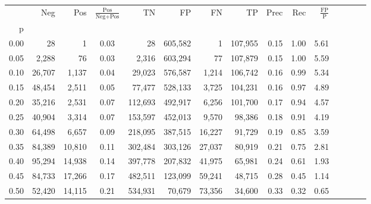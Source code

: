 \begin{tabular}{rrrcrrrrrrrrrrr}
\toprule
{} &     Neg &     Pos & $\frac{\text{Pos}}{\text{Neg}+\text{Pos}}$ &       TN &       FP &       FN &       TP &  Prec &   Rec & $\frac{\text{FP}}{\text{P}}$ \\
p    &         &         &                                            &          &          &          &          &       &       &                              \\
\midrule
0.00 &      28 &       1 &                                       0.03 &       28 &  605,582 &        1 &  107,955 &  0.15 &  1.00 &                         5.61 \\
0.05 &   2,288 &      76 &                                       0.03 &    2,316 &  603,294 &       77 &  107,879 &  0.15 &  1.00 &                         5.59 \\
0.10 &  26,707 &   1,137 &                                       0.04 &   29,023 &  576,587 &    1,214 &  106,742 &  0.16 &  0.99 &                         5.34 \\
0.15 &  48,454 &   2,511 &                                       0.05 &   77,477 &  528,133 &    3,725 &  104,231 &  0.16 &  0.97 &                         4.89 \\
0.20 &  35,216 &   2,531 &                                       0.07 &  112,693 &  492,917 &    6,256 &  101,700 &  0.17 &  0.94 &                         4.57 \\
0.25 &  40,904 &   3,314 &                                       0.07 &  153,597 &  452,013 &    9,570 &   98,386 &  0.18 &  0.91 &                         4.19 \\
0.30 &  64,498 &   6,657 &                                       0.09 &  218,095 &  387,515 &   16,227 &   91,729 &  0.19 &  0.85 &                         3.59 \\
0.35 &  84,389 &  10,810 &                                       0.11 &  302,484 &  303,126 &   27,037 &   80,919 &  0.21 &  0.75 &                         2.81 \\
0.40 &  95,294 &  14,938 &                                       0.14 &  397,778 &  207,832 &   41,975 &   65,981 &  0.24 &  0.61 &                         1.93 \\
0.45 &  84,733 &  17,266 &                                       0.17 &  482,511 &  123,099 &   59,241 &   48,715 &  0.28 &  0.45 &                         1.14 \\
0.50 &  52,420 &  14,115 &                                       0.21 &  534,931 &   70,679 &   73,356 &   34,600 &  0.33 &  0.32 &                         0.65 \\

\end{tabular}
